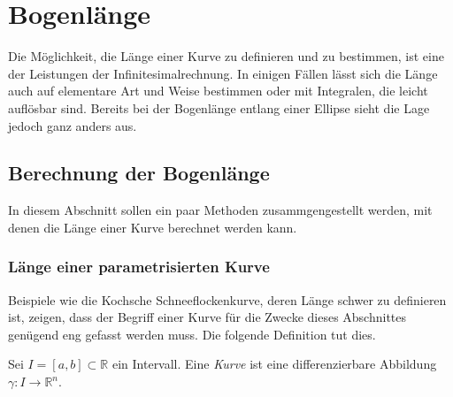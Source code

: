 %
%
%
\section{Bogenlänge 
\label{buch:geometrie:section:ellipsenbogen}}
Die Möglichkeit, die Länge einer Kurve zu definieren und zu bestimmen,
ist eine der Leistungen der Infinitesimalrechnung.
In einigen Fällen lässt sich die Länge auch auf elementare Art und
Weise bestimmen oder mit Integralen, die leicht auflösbar sind.
Bereits bei der Bogenlänge entlang einer Ellipse sieht die Lage
jedoch ganz anders aus.

\subsection{Berechnung der Bogenlänge}
In diesem Abschnitt sollen ein paar Methoden zusammgengestellt werden,
mit denen die Länge einer Kurve berechnet werden kann.

\subsubsection{Länge einer parametrisierten Kurve}
Beispiele wie die Kochsche Schneeflockenkurve, deren Länge schwer
zu definieren ist, zeigen, dass der Begriff einer Kurve für die Zwecke
dieses Abschnittes genügend eng gefasst werden muss.
Die folgende Definition tut dies.

\begin{definition}
\label{buch:geometrie:def:kurve}
Sei $I=[a,b]\subset\mathbb{R}$ ein Intervall.
Eine {\em Kurve} ist eine differenzierbare Abbildung
$\gamma \colon I \to \mathbb{R}^n$.
\end{definition}

